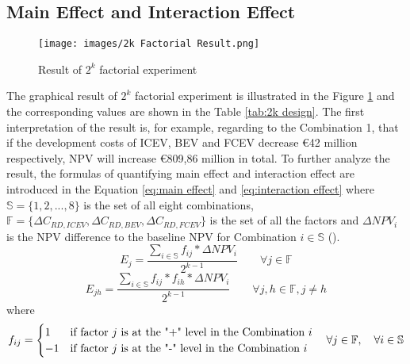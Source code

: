 \subsection{Main Effect and Interaction Effect}\label{Result 1}
\begin{figure}[h!]
\begin{center}
\texttt{[image: images/2k Factorial Result.png]}
\caption{Result of $2^k$ factorial experiment}
\label{fig:FactorialResult}
\end{center}
\end{figure}
The graphical result of $2^k$ factorial experiment is illustrated in the Figure \ref{fig:FactorialResult} and the corresponding values are shown in the Table \ref{tab:2k design}. The first interpretation of the result is, for example, regarding to the Combination 1, that if the development costs of \gls{ICEV}, \gls{BEV} and \gls{FCEV} decrease \euro{42} million respectively, \gls{NPV} will increase \euro{809,86} million in total. To further analyze the result, the formulas of quantifying main effect and interaction effect are introduced in the Equation \ref{eq:main effect} and \ref{eq:interaction effect} where $\mathbb S=\{1, 2, ..., 8\}$ is the set of all eight combinations,  $\mathbb F=\{\Delta C_{RD,ICEV}, \Delta C_{RD,BEV}, \Delta C_{RD,FCEV}\}$ is the set of all the factors and $\Delta NPV_i$ is the \gls{NPV} difference to the baseline \gls{NPV} for Combination $i \in \mathbb S$ (\cite{law2007simulation}).
\begin{equation} \label{eq:main effect}
E_j = \frac{\sum_{i \in \mathbb S} f_{ij} * \Delta NPV_i}{2^{k-1}} \qquad \forall j \in \mathbb F
\end{equation}
\begin{equation} \label{eq:interaction effect}
E_{jh} = \frac{\sum_{i \in \mathbb S} f_{ij} *f_{ih} * \Delta NPV_i}{2^{k-1}} \qquad \forall j, h \in \mathbb F, j \not = h
\end{equation}
where
\begin{equation} \label{eq:fij}
f_{ij} = 
    \begin{cases}
          1 & \text{if factor $j$ is at the "+" level in the Combination $i$} \\
         -1 & \text{if factor $j$ is at the "-" level in the Combination $i$}\\
    \end{cases}\\ 
    \quad \forall j \in \mathbb F, \quad \forall i \in \mathbb S
\end{equation}
